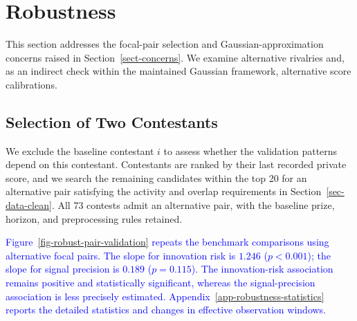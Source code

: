 \documentclass[mnsc]{informs3}
\begin{document}
\FloatBarrier


\section{Robustness}

{This section addresses the focal-pair selection and Gaussian-approximation concerns raised in Section~\ref{sect-concerns}. We examine alternative rivalries and, as an indirect check within the maintained Gaussian framework, alternative score calibrations.}

\subsection{Selection of Two Contestants}\label{sect-robust-2players}

{We exclude the baseline contestant $i$ to assess whether the validation patterns depend on this contestant. Contestants are ranked by their last recorded private score, and we search the remaining candidates within the top 20 for an alternative pair satisfying the activity and overlap requirements in Section~\ref{sec-data-clean}. All 73 contests admit an alternative pair, with the baseline prize, horizon, and preprocessing rules retained.}

\textcolor{blue}{Figure~\ref{fig-robust-pair-validation} repeats the benchmark comparisons using alternative focal pairs. The slope for innovation risk is $1.246$ ($p<0.001$); the slope for signal precision is $0.189$ ($p=0.115$). The innovation-risk association remains positive and statistically significant, whereas the signal-precision association is less precisely estimated. Appendix~\ref{app-robustness-statistics} reports the detailed statistics and changes in effective observation windows.}
\end{document}
